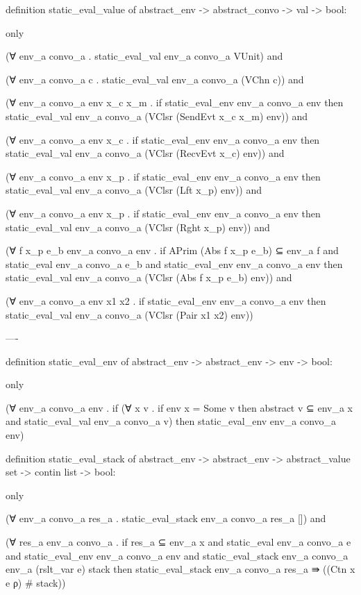 \documentclass{article}
\begin{document}
definition static_eval_value of
  abstract_env -> abstract_convo -> val -> bool: 

only

(∀ env_a convo_a . static_eval_val env_a convo_a VUnit) and

(∀ env_a convo_a c . static_eval_val env_a convo_a (VChn c)) and

(∀ env_a convo_a env x_c x_m .
  if
    static_eval_env env_a convo_a env
  then
    static_eval_val env_a convo_a (VClsr (SendEvt x_c x_m) env)) and

(∀ env_a convo_a env x_c  .
  if
    static_eval_env env_a convo_a env
  then
    static_eval_val env_a convo_a (VClsr (RecvEvt x_c) env)) and

(∀ env_a convo_a env x_p  .
  if
    static_eval_env env_a convo_a env
  then
    static_eval_val env_a convo_a (VClsr (Lft x_p) env)) and

(∀ env_a convo_a env x_p  .
  if
    static_eval_env env_a convo_a env
  then
    static_eval_val env_a convo_a (VClsr (Rght x_p) env)) and


(∀ f x_p e_b env_a convo_a env .
  if
    {APrim (Abs f x_p e_b)} ⊆ env_a f and 
    static_eval env_a convo_a e_b and 
    static_eval_env env_a convo_a env
  then
    static_eval_val env_a convo_a (VClsr (Abs f x_p e_b) env)) and

(∀ env_a convo_a env x1 x2 .
  if
    static_eval_env env_a convo_a env
  then
    static_eval_val env_a convo_a (VClsr (Pair x1 x2) env))

----

definition static_eval_env of abstract_env -> abstract_env -> env -> bool:

only 

(∀ env_a convo_a env .
  if
    (∀ x v . if env x = Some v then
      {abstract v} ⊆ env_a x and
      static_eval_val env_a convo_a v)
  then 
    static_eval_env env_a convo_a env)


definition static_eval_stack of
  abstract_env -> abstract_env -> abstract_value set -> contin list -> bool:

only 

(∀ env_a convo_a res_a . static_eval_stack env_a convo_a res_a []) and

(∀ res_a env_a convo_a . 
  if 
    res_a ⊆ env_a x and
    static_eval env_a convo_a e and
    static_eval_env env_a convo_a env and
    static_eval_stack env_a convo_a env_a (rslt_var e) stack 
  then
    static_eval_stack env_a convo_a res_a ⇛ ((Ctn x e ρ) # stack))
\end{document}
